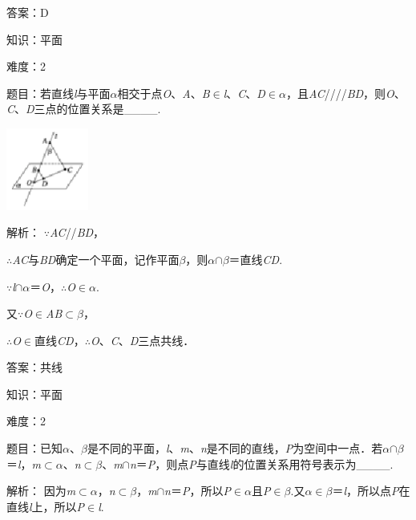 \documentclass{article} %
\begin{document}
答案：D

知识：平面

难度：2

题目：若直线\textit{l}与平面\textit{$\alpha$}相交于点\textit{O}、\textit{A}、\textit{B}$\mathrm{\in}$\textit{l}、\textit{C}、\textit{D}$\mathrm{\in}$\textit{$\alpha$}，且\textit{AC}////\textit{BD}，则\textit{O}、\textit{C}、\textit{D}三点的位置关系是\_\_\underbar{}\_\_.

\includegraphics*[width=1.07in, height=1.06in, keepaspectratio=false]{image96}

解析：
$\mathrm{\because}$\textit{AC}//\textit{BD}，

$\mathrm{\therefore}$\textit{AC}与\textit{BD}确定一个平面，记作平面\textit{$\beta$}，则\textit{$\alpha$}$\mathrm{\cap}$\textit{$\beta$}＝直线\textit{CD}.

$\mathrm{\because}$\textit{l}$\mathrm{\cap}$\textit{$\alpha$}＝\textit{O}，$\mathrm{\therefore}$\textit{O}$\mathrm{\in}$\textit{$\alpha$}.

又$\mathrm{\because}$\textit{O}$\mathrm{\in}$\textit{AB}$\mathrm{\subset }$\textit{$\beta$}，

$\mathrm{\therefore}$\textit{O}$\mathrm{\in}$直线\textit{CD}，$\mathrm{\therefore}$\textit{O}、\textit{C}、\textit{D}三点共线．

答案：共线

知识：平面

难度：2

题目：已知\textit{$\alpha$}、\textit{$\beta$}是不同的平面，\textit{l}、\textit{m}、\textit{n}是不同的直线，\textit{P}为空间中一点．若\textit{$\alpha$}$\mathrm{\cap}$\textit{$\beta$}＝\textit{l}，\textit{m}$\mathrm{\subset }$\textit{$\alpha$}、\textit{n}$\mathrm{\subset }$\textit{$\beta$}、\textit{m}$\mathrm{\cap}$\textit{n}＝\textit{P}，则点\textit{P}与直线\textit{l}的位置关系用符号表示为\_\_\textit{}\_\_.

解析：
因为\textit{m}$\mathrm{\subset }$\textit{$\alpha$}，\textit{n}$\mathrm{\subset }$\textit{$\beta$}，\textit{m}$\mathrm{\cap}$\textit{n}＝\textit{P}，所以\textit{P}$\mathrm{\in}$\textit{$\alpha$}且\textit{P}$\mathrm{\in}$\textit{$\beta$}.又\textit{$\alpha$}$\mathrm{\in}$\textit{$\beta$}＝\textit{l}，所以点\textit{P}在直线\textit{l}上，所以\textit{P}$\mathrm{\in}$\textit{l}.
\end{document}
